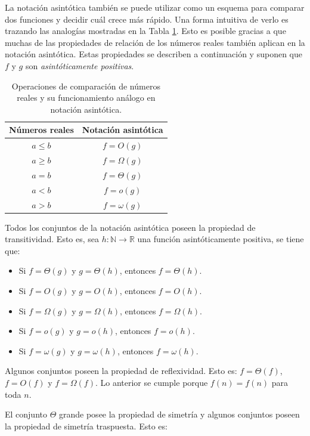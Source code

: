 La notación asintótica también se puede utilizar como un esquema para comparar
dos funciones y decidir cuál crece más rápido. Una
forma intuitiva de verlo es trazando las analogías mostradas en la 
Tabla \ref{tab:func-comp}. Esto es posible gracias a que muchas de 
las propiedades de relación de los números reales también aplican en la
notación asintótica. Estas propiedades se describen a continuación y
suponen que $f$ y $g$ son \emph{asintóticamente positivas}.

\begin{table}
\label{tab:func-comp}
\caption{Operaciones de comparación de números reales y su funcionamiento análogo en 
notación asintótica.}
\centering
\begin{tabular}{cc}
    \toprule 
        Números reales & Notación asintótica\tabularnewline
    \midrule
        $a\leq b$ & $f=O(g)$\tabularnewline
        $a\ge b$ & $f=\Omega(g)$\tabularnewline
        $a=b$ & $f=\Theta(g)$\tabularnewline
        $a<b$ & $f=o(g)$\tabularnewline
        $a>b$ & $f=\omega(g)$\tabularnewline
    \bottomrule
\end{tabular}
\end{table}

Todos los conjuntos de la notación asintótica poseen la propiedad de transitividad.
Esto es, sea $h:\mathbb{N}\to\mathbb{R}$ una función asintóticamente positiva, se
tiene que:

\begin{itemize}[label=\textbullet]
    \item Si $f=\Theta(g)$ y $g=\Theta(h)$, entonces $f=\Theta(h)$.
    \item Si $f=O(g)$ y $g=O(h)$, entonces $f=O(h)$. 
    \item Si $f=\Omega(g)$ y $g=\Omega(h)$, entonces $f=\Omega(h)$.
    \item Si $f=o(g)$ y $g=o(h)$, entonces $f=o(h)$.
    \item Si $f=\omega(g)$ y $g=\omega(h)$, entonces $f=\omega(h)$.
\end{itemize}

Algunos conjuntos poseen la propiedad de reflexividad. Esto es: 
$f=\Theta(f)$, $f=O(f)$ y $f=\Omega(f)$. 
Lo anterior se cumple porque $f(n)=f(n)$ para toda $n$.

El conjunto $\Theta$ grande posee la propiedad de simetría y algunos conjuntos 
poseen la propiedad de simetría traspuesta. Esto es:


